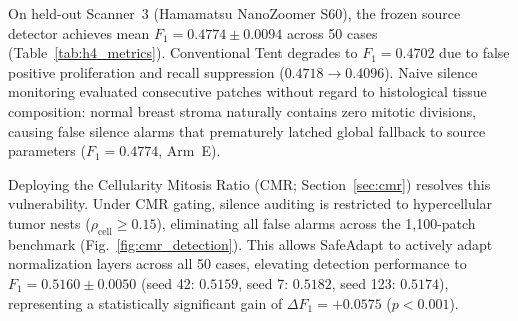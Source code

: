 \documentclass[journal]{IEEEtran}
\begin{document}
On held-out Scanner~3 (Hamamatsu NanoZoomer S60), the frozen source detector achieves mean $F_1 = 0.4774 \pm 0.0094$ across 50 cases (Table~\ref{tab:h4_metrics}). Conventional Tent degrades to $F_1 = 0.4702$ due to false positive proliferation and recall suppression ($0.4718 \to 0.4096$). Naive silence monitoring evaluated consecutive patches without regard to histological tissue composition: normal breast stroma naturally contains zero mitotic divisions, causing false silence alarms that prematurely latched global fallback to source parameters ($F_1 = 0.4774$, Arm~E).

Deploying the Cellularity Mitosis Ratio (CMR; Section~\ref{sec:cmr}) resolves this vulnerability. Under CMR gating, silence auditing is restricted to hypercellular tumor nests ($\rho_{\text{cell}} \ge 0.15$), eliminating all false alarms across the 1,100-patch benchmark (Fig.~\ref{fig:cmr_detection}). This allows SafeAdapt to actively adapt normalization layers across all 50 cases, elevating detection performance to $F_1 = \mathbf{0.5160} \pm 0.0050$ (seed 42: $0.5159$, seed 7: $0.5182$, seed 123: $0.5174$), representing a statistically significant gain of $\Delta F_1 = +0.0575$ ($p < 0.001$).

\begin{table}[t]
\centering
\caption{Held-Out MIDOG Scanner 3 Detection Performance Across Five Adaptation Arms and Three Random Seeds ($r = 30.0$\,px, $\tau = 0.20$, $h \ge 1.0$\,px, 50 Cases, 1,100 Spatially Stratified Patches, 118 Ground-Truth Mitoses).}
\label{tab:h4_metrics}
\scriptsize
\renewcommand{\arraystretch}{0.92}
\setlength{\tabcolsep}{2.5pt}
\end{table}
\end{document}
